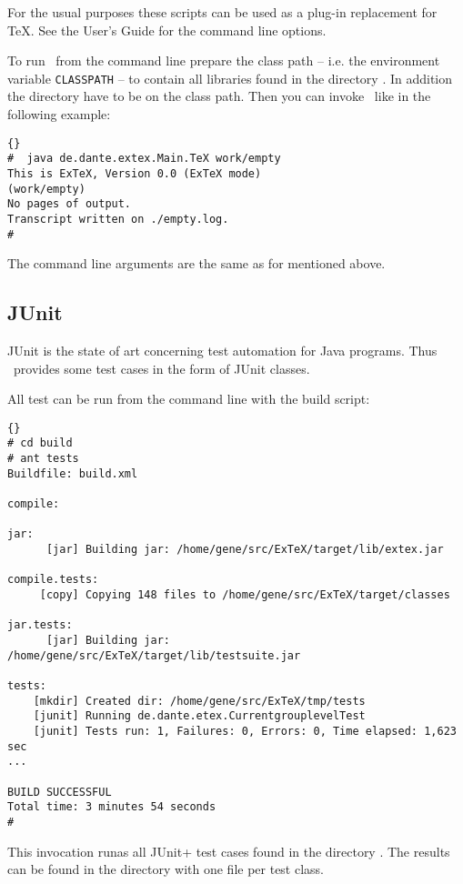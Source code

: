 For the usual purposes these scripts can be used as a plug-in
replacement for \TeX. See the User's Guide for the command line
options.

To run \ExTeX\ from the command line prepare the class path -- i.e.
the environment variable \texttt{CLASSPATH} -- to contain all
libraries found in the directory . In addition the
directory  have to be on the class path.
Then you can invoke \ExTeX\ like in the following example:

\begin{lstlisting}{}
#  java de.dante.extex.Main.TeX work/empty
This is ExTeX, Version 0.0 (ExTeX mode)
(work/empty)
No pages of output.
Transcript written on ./empty.log.
#
\end{lstlisting}{}

The command line arguments are the same as for  mentioned
above.


\subsection{JUnit}\label{sec:shell-junit}

JUnit is the state of art concerning test automation for Java
programs. Thus \ExTeX\ provides some test cases in the form of JUnit
classes.

All test can be run from the command line with the build script:

\begin{lstlisting}{}
# cd build
# ant tests
Buildfile: build.xml

compile:

jar:
      [jar] Building jar: /home/gene/src/ExTeX/target/lib/extex.jar

compile.tests:
     [copy] Copying 148 files to /home/gene/src/ExTeX/target/classes

jar.tests:
      [jar] Building jar: /home/gene/src/ExTeX/target/lib/testsuite.jar

tests:
    [mkdir] Created dir: /home/gene/src/ExTeX/tmp/tests
    [junit] Running de.dante.etex.CurrentgrouplevelTest
    [junit] Tests run: 1, Failures: 0, Errors: 0, Time elapsed: 1,623 sec
...

BUILD SUCCESSFUL
Total time: 3 minutes 54 seconds
#
\end{lstlisting}

This invocation runas all \+JUnit+ test cases found in the directory
. The results can be found in the directory
 with one file per test class.

